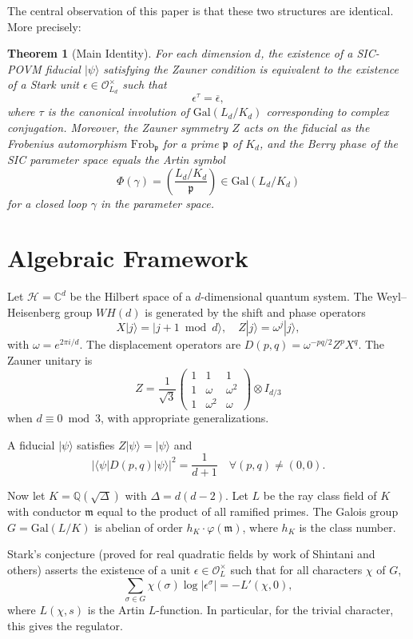 \documentclass[12pt]{article}
\newtheorem{theorem}{Theorem}
\begin{document}
The central observation of this paper is that these two structures are identical. More precisely:

\begin{theorem}[Main Identity]
For each dimension $d$, the existence of a SIC-POVM fiducial $|\psi\rangle$ satisfying the Zauner condition is equivalent to the existence of a Stark unit $\epsilon \in \mathcal{O}_{L_d}^\times$ such that
\[
\epsilon^{\tau} = \overline{\epsilon},
\]
where $\tau$ is the canonical involution of $\text{Gal}(L_d/K_d)$ corresponding to complex conjugation. Moreover, the Zauner symmetry $Z$ acts on the fiducial as the Frobenius automorphism $\text{Frob}_\mathfrak{p}$ for a prime $\mathfrak{p}$ of $K_d$, and the Berry phase of the SIC parameter space equals the Artin symbol
\[
\Phi(\gamma) = \left( \frac{L_d/K_d}{\mathfrak{p}} \right) \in \text{Gal}(L_d/K_d)
\]
for a closed loop $\gamma$ in the parameter space.
\end{theorem}

\section{Algebraic Framework}

Let $\mathcal{H} = \mathbb{C}^d$ be the Hilbert space of a $d$-dimensional quantum system. The Weyl–Heisenberg group $WH(d)$ is generated by the shift and phase operators
\[
X|j\rangle = |j+1 \bmod d\rangle, \quad Z|j\rangle = \omega^j|j\rangle,
\]
with $\omega = e^{2\pi i/d}$. The displacement operators are $D(p,q) = \omega^{-pq/2} Z^p X^q$. The Zauner unitary is
\[
Z = \frac{1}{\sqrt{3}} \begin{pmatrix} 1 & 1 & 1 \\ 1 & \omega & \omega^2 \\ 1 & \omega^2 & \omega \end{pmatrix} \otimes I_{d/3}
\]
when $d \equiv 0 \bmod 3$, with appropriate generalizations.

A fiducial $|\psi\rangle$ satisfies $Z|\psi\rangle = |\psi\rangle$ and
\[
|\langle\psi|D(p,q)|\psi\rangle|^2 = \frac{1}{d+1} \quad \forall (p,q) \neq (0,0).
\]

Now let $K = \mathbb{Q}(\sqrt{\Delta})$ with $\Delta = d(d-2)$. Let $L$ be the ray class field of $K$ with conductor $\mathfrak{m}$ equal to the product of all ramified primes. The Galois group $G = \text{Gal}(L/K)$ is abelian of order $h_K \cdot \varphi(\mathfrak{m})$, where $h_K$ is the class number.

Stark's conjecture (proved for real quadratic fields by work of Shintani and others) asserts the existence of a unit $\epsilon \in \mathcal{O}_L^\times$ such that for all characters $\chi$ of $G$,
\[
\sum_{\sigma \in G} \chi(\sigma) \log |\epsilon^\sigma| = -L'(\chi, 0),
\]
where $L(\chi, s)$ is the Artin $L$-function. In particular, for the trivial character, this gives the regulator.
\end{document}
